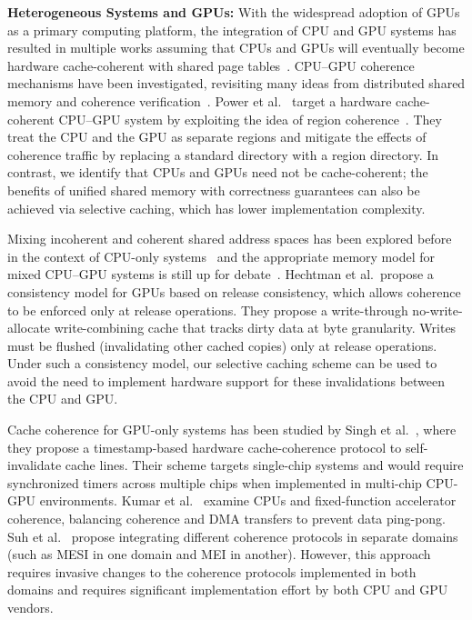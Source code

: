 \textbf{Heterogeneous Systems and GPUs:} With the widespread adoption of GPUs as
a primary computing platform, the integration of CPU and GPU systems has
resulted in multiple works assuming that CPUs and GPUs will eventually become
hardware cache-coherent with shared page
tables~\cite{Power2014,Pichai2014,ref:agarwal:asplos2015,ref:agarwal:hpca2015}.  CPU--GPU coherence
mechanisms have been investigated, revisiting many ideas from distributed shared
memory and coherence
verification~\cite{Gelado2010,Power2013,wu2014,Kaxiras2013}. Power et
al.~\cite{Power2013} target a hardware cache-coherent CPU--GPU system by
exploiting the idea of region
coherence~\cite{Cantin2005,Alisafaee2012,Moshovos2005,Zebchuk2007}. They treat
the CPU and the GPU as separate regions and mitigate the effects of coherence
traffic by replacing a standard directory with a region directory.  In contrast,
we identify that CPUs and GPUs need not be cache-coherent; the benefits of
unified shared memory with correctness guarantees can also be achieved via
selective caching, which has lower implementation complexity.

Mixing incoherent and coherent shared address spaces has been explored before in
the context of CPU-only systems~\cite{Huh04} and the appropriate memory model
for mixed CPU--GPU systems is still up for
debate~\cite{Lim2012,Hechtman2014,Hower2014,Gaster2015}.  Hechtman et
al.~propose a consistency model for GPUs based on release consistency, which
allows coherence to be enforced only at release operations.  They propose a
write-through no-write-allocate write-combining cache that tracks dirty data at
byte granularity.  Writes must be flushed (invalidating other cached copies)
only at release operations.  Under such a consistency model, our selective
caching scheme can be used to avoid the need to implement hardware support for
these invalidations between the CPU and GPU.

Cache coherence for GPU-only systems has been studied by Singh et
al.~\cite{Singh2013}, where they propose a timestamp-based hardware
cache-coherence protocol to self-invalidate cache lines. Their scheme targets
single-chip systems and would require synchronized timers across multiple chips
when implemented in multi-chip CPU-GPU environments.  Kumar et
al.~\cite{Kumar2015} examine CPUs and fixed-function accelerator coherence,
balancing coherence and DMA transfers to prevent data ping-pong.  Suh et
al.~\cite{Suh2004} propose integrating different coherence protocols in separate
domains (such as MESI in one domain and MEI in another).  However, this approach
requires invasive changes to the coherence protocols implemented in both domains
and requires significant implementation effort by both CPU and GPU vendors.

